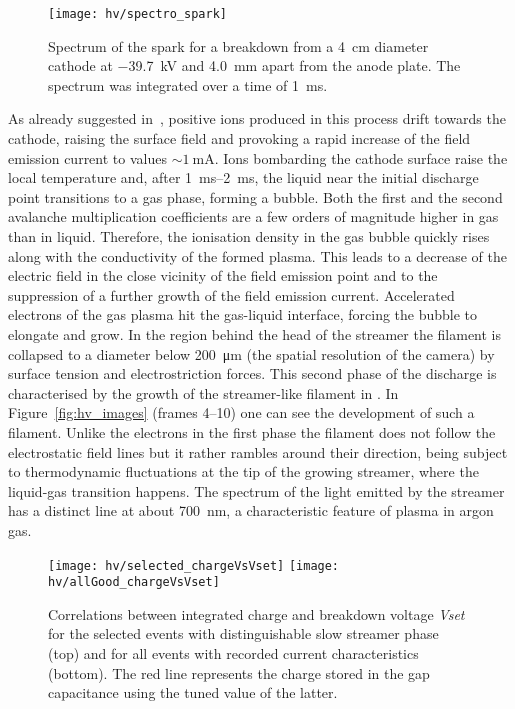 \begin{figure}[tbp]
	\centering
	\texttt{[image: hv/spectro\_spark]}
	\caption[ test spark spectrum]{%
		Spectrum of the spark for a breakdown from a \SI{4}{\centi\metre} diameter cathode at \SI{-39.7}{\kilo\volt} and \SI{4.0}{\milli\metre} apart from the anode plate.
		The spectrum was integrated over a time of \SI{1}{\milli\second}.
	}
	\label{fig:hv_spectro_spark}
\end{figure}

As already suggested in~\cite{breakdown_14}, positive ions produced in this process drift towards the cathode, raising the surface field and provoking a rapid increase of the field emission current to values $\sim{\SI{1}{\milli\ampere}}$.
Ions bombarding the cathode surface raise the local temperature and, after \SIrange{1}{2}{\milli\second}, the liquid near the initial discharge point transitions to a gas phase, forming a bubble.
Both the first and the second avalanche multiplication coefficients are a few orders of magnitude higher in gas than in liquid.
Therefore, the ionisation density in the gas bubble quickly rises along with the conductivity of the formed plasma.
This leads to a decrease of the electric field in the close vicinity of the field emission point and to the suppression of a further growth of the field emission current.
Accelerated electrons of the gas plasma hit the gas-liquid interface, forcing the bubble to elongate and grow.
In the region behind the head of the streamer the filament is collapsed to a diameter below \SI{200}{\micro\metre} (the spatial resolution of the camera) by surface tension and electrostriction forces.
This second phase of the discharge is characterised by the growth of the streamer-like filament in \lar{}.
In Figure~\ref{fig:hv_images} (frames \numrange{4}{10}) one can see the development of such a filament.
Unlike the electrons in the first phase the filament does not follow the electrostatic field lines but it rather rambles around their direction, being subject to thermodynamic fluctuations at the tip of the growing streamer, where the liquid-gas transition happens.
The spectrum of the light emitted by the streamer has a distinct line at about \SI{700}{\nano\metre}, a characteristic feature of plasma in argon gas.

\begin{figure}[tbp]
	\centering
	\texttt{[image: hv/selected\_chargeVsVset]}
	\texttt{[image: hv/allGood\_chargeVsVset]}
	\caption[ test integrated charge versus breakdown voltage]{%
		Correlations between integrated charge and breakdown voltage \emph{Vset} for the selected events with distinguishable slow streamer phase (top) and for all events with recorded current characteristics (bottom).
		The red line represents the charge stored in the gap capacitance using the tuned value of the latter.
	}
	\label{fig:hv_chargeVsVset}
\end{figure}

